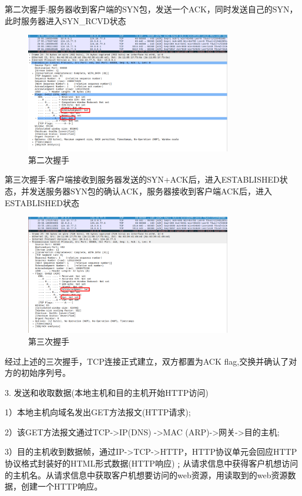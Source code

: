 \documentclass[11pt]{article}
\begin{document}
  第二次握手:服务器收到客户端的SYN包，发送一个ACK，同时发送自己的SYN，此时服务器进入SYN_RCVD状态
  \begin{figure}[htbp]
    \centering
    \includegraphics[width=0.8\textwidth]{fig/hand2.png}
    \caption{第二次握手}
    \label{fig:2}
  \end{figure}


  第三次握手:客户端接收到服务器发送的SYN+ACK后，进入ESTABLISHED状态，并发送服务器SYN包的确认ACK，服务器接收到客户端ACK后，进入ESTABLISHED状态
  \begin{figure}[htbp]
    \centering
    \includegraphics[width=0.8\textwidth]{fig/hand3.png}
    \caption{第三次握手}
    \label{fig:3}
  \end{figure}

  经过上述的三次握手，TCP连接正式建立，双方都置为ACK flag,交换并确认了对方的初始序列号。

  
3. 发送和收取数据(本地主机和目的主机开始HTTP访问)

  1）本地主机向域名发出GET方法报文(HTTP请求);

  2）该GET方法报文通过TCP->IP(DNS) ->MAC (ARP)->网关->目的主机;

  3）目的主机收到数据帧，通过IP->TCP->HTTP，HTTP协议单元会回应HTTP协议格式封装好的HTML形式数据(HTTP响应)﹔从请求信息中获得客户机想访问的主机名。从请求信息中获取客户机想要访问的web资源，用读取到的web资源数据，创建一个HTTP响应。
  
\end{document}
